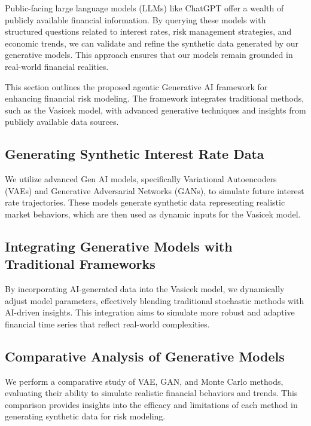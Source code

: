 \documentclass[a4paper,headinclude=on,footinclude=on,12pt,oneside]{scrbook}
\begin{document}
	Public-facing large language models (LLMs) like ChatGPT offer a wealth of publicly available financial information. By querying these models with structured questions related to interest rates, risk management strategies, and economic trends, we can validate and refine the synthetic data generated by our generative models. This approach ensures that our models remain grounded in real-world financial realities.
	
	
	This section outlines the proposed agentic Generative AI framework for enhancing financial risk modeling. The framework integrates traditional methods, such as the Vasicek model, with advanced generative techniques and insights from publicly available data sources.
	
	\subsection{Generating Synthetic Interest Rate Data}
	
	We utilize advanced Gen AI models, specifically Variational Autoencoders (VAEs) and Generative Adversarial Networks (GANs), to simulate future interest rate trajectories. These models generate synthetic data representing realistic market behaviors, which are then used as dynamic inputs for the Vasicek model.
	
	\subsection{Integrating Generative Models with Traditional Frameworks}
	
	By incorporating AI-generated data into the Vasicek model, we dynamically adjust model parameters, effectively blending traditional stochastic methods with AI-driven insights. This integration aims to simulate more robust and adaptive financial time series that reflect real-world complexities.
	
	\subsection{Comparative Analysis of Generative Models}
	
	We perform a comparative study of VAE, GAN, and Monte Carlo methods, evaluating their ability to simulate realistic financial behaviors and trends. This comparison provides insights into the efficacy and limitations of each method in generating synthetic data for risk modeling.
	
\end{document}
